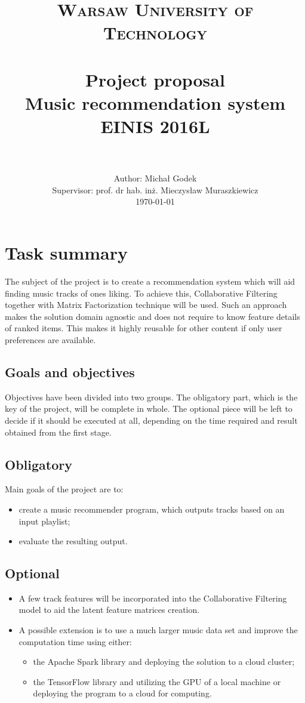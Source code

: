 \documentclass{article}
\title{
		\usefont{OT1}{bch}{b}{n}
		\normalfont \normalsize \textsc{Warsaw University of Technology} \\ [25pt]
		\horrule{1pt} \\[0.4cm]
		\normalfont \normalsize Project proposal\\
		\huge Music recommendation system \\[0.3cm]
		\normalfont \normalsize EINIS 2016L\\
		\horrule{1pt} \\[0.5cm]
}
\author{
		\normalfont 	\normalsize
        Author: Michał Godek	\normalsize \\[0.2cm]
        \footnotesize Supervisor: prof. dr hab. inż. Mieczysław Muraszkiewicz \normalfont 	 \normalsize \\[0.5cm]
        \today \\[-3pt]
}
\date{}
\numberwithin{equation}{section}		%
\numberwithin{figure}{section}			%
\numberwithin{table}{section}				%
\begin{document}
\maketitle
\newpage
\tableofcontents
\newpage

\section{Task summary}
The subject of the project is to create a recommendation system which will aid finding music tracks of ones liking. To achieve this, Collaborative Filtering together with Matrix Factorization technique will be used. Such an approach makes the solution domain agnostic and does not require to know feature details of ranked items. This makes it highly reusable for other content if only user preferences are available.

\subsection{Goals and objectives}
Objectives have been divided into two groups. The obligatory part, which is the key of the project, will be complete in whole. The optional piece will be left to decide if it should be executed at all, depending on the time required and result obtained from the first stage. 

\subsection{Obligatory}
Main goals of the project are to:
\begin{itemize}
	\item create a music recommender program, which outputs tracks based on an input playlist;
	\item evaluate the resulting output.
\end{itemize}

\subsection{Optional}
\begin{itemize}
\item A few track features will be incorporated into the Collaborative Filtering model to aid the latent feature matrices creation.
\item A possible extension is to use a much larger music data set and improve the computation time using either:
\begin{itemize}
	\item the Apache Spark library and deploying the solution to a cloud cluster;
	\item the TensorFlow\cite{MatrixFactWithTensorFL} library and utilizing the GPU of a local machine or deploying the program to a cloud for computing.
\end{itemize}
\end{itemize}
\end{document}
